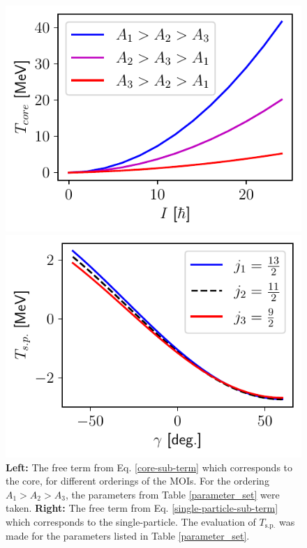 \documentclass[myclassdoc,debug]{rjparticle}
\begin{document}
\begin{figure}
\centering
\begin{minipage}{.5\textwidth}
  \centering
  \includegraphics[scale=0.7]{figs/T_Core.pdf}
\end{minipage}%
\begin{minipage}{.5\textwidth}
  \centering
 \includegraphics[scale=0.7]{figs/T_SingleParticle.pdf}
\end{minipage}
\caption{\textbf{Left:} The free term from Eq. \ref{core-sub-term} which corresponds to the core, for different orderings of the MOIs. For the ordering $A_1>A_2>A_3$, the parameters from Table \ref{parameter_set} were taken. \textbf{Right:} The free term from Eq. \ref{single-particle-sub-term} which corresponds to the single-particle. The evaluation of $T_\text{s.p.}$ was made for the parameters listed in Table \ref{parameter_set}.}
    \label{sub_terms}
\end{figure}
\end{document}
